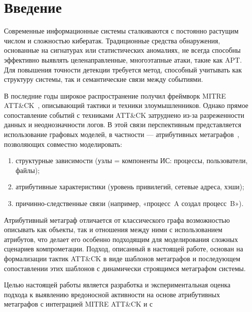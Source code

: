 \section*{Введение}

Современные информационные системы сталкиваются с постоянно растущим числом и сложностью кибератак. Традиционные средства обнаружения, основанные на сигнатурах или статистических аномалиях, не всегда способны эффективно выявлять целенаправленные, многоэтапные атаки, такие как APT. Для повышения точности детекции требуется метод, способный учитывать как структуру системы, так и семантические связи между событиями.

В последние годы широкое распространение получил фреймворк MITRE ATT\&CK~\cite{mitre}, описывающий тактики и техники злоумышленников. Однако прямое сопоставление событий с техниками ATT\&CK затруднено из-за разреженности данных и неоднозначности логов. В этой связи перспективным представляется использование графовых моделей, в частности — атрибутивных метаграфов~\cite{latypov2020,astanin2012}, позволяющих совместно моделировать:

\begin{enumerate}
\item структурные зависимости (узлы = компоненты ИС: процессы, пользователи, файлы);
    \item атрибутивные характеристики (уровень привилегий, сетевые адреса, хэши);
    \item причинно-следственные связи (например, «процесс~A создал процесс~B»).
\end{enumerate}

Атрибутивный метаграф отличается от классического графа возможностью описывать как объекты, так и отношения между ними с использованием атрибутов, что делает его особенно подходящим для моделирования сложных сценариев компрометации. Подход, описанный в настоящей работе, основан на формализации тактик ATT\&CK в виде шаблонов метаграфов и последующем сопоставлении этих шаблонов с динамически строящимся метаграфом системы.

Целью настоящей работы является разработка и экспериментальная оценка подхода к выявлению вредоносной активности на основе атрибутивных метаграфов с интеграцией MITRE ATT\&CK и  с 